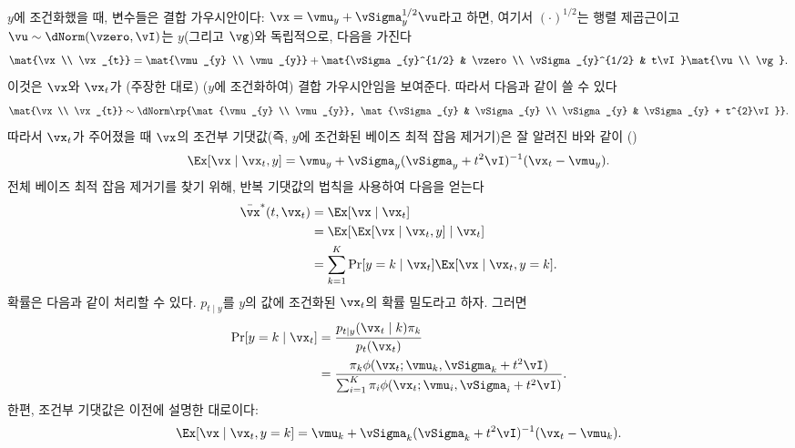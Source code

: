 \documentclass[../../book-main_ko.tex]{subfiles}
\begin{document}
\begin{example}
	\(y\)에 조건화했을 때, 변수들은 결합 가우시안이다: \(\vx = \vmu_{y} + \vSigma_{y}^{1/2}\vu\)라고 하면, 여기서 \((\cdot)^{1/2}\)는 행렬 제곱근이고 \(\vu \sim \dNorm(\vzero, \vI)\)는 \(y\)(그리고 \(\vg\))와 독립적으로, 다음을 가진다
	\begin{equation}
		\mat{\vx \\ \vx_{t}} = \mat{\vmu_{y} \\ \vmu_{y}} + \mat{\vSigma_{y}^{1/2} & \vzero \\ \vSigma_{y}^{1/2} & t\vI}\mat{\vu \\ \vg}.
	\end{equation}
	이것은 \(\vx\)와 \(\vx_{t}\)가 (주장한 대로) (\(y\)에 조건화하여) 결합 가우시안임을 보여준다. 따라서 다음과 같이 쓸 수 있다
	\begin{equation}
		\mat{\vx \\ \vx_{t}} \sim \dNorm\rp{\mat{\vmu_{y} \\ \vmu_{y}}, \mat{\vSigma_{y} & \vSigma_{y} \\ \vSigma_{y} & \vSigma_{y} + t^{2}\vI}}.
	\end{equation}
	따라서 \(\vx_{t}\)가 주어졌을 때 \(\vx\)의 조건부 기댓값(즉, \(y\)에 조건화된 베이즈 최적 잡음 제거기)은 잘 알려진 바와 같이 ()
	\begin{equation}
		\Ex[\vx \mid \vx_{t}, y] = \vmu_{y} + \vSigma_{y}(\vSigma_{y} + t^{2}\vI)^{-1}(\vx_{t} - \vmu_{y}).
	\end{equation}
	전체 베이즈 최적 잡음 제거기를 찾기 위해, 반복 기댓값의 법칙을 사용하여 다음을 얻는다
	\begin{align}
		\bar{\vx}^{\ast}(t, \vx_{t})
		&= \Ex[\vx \mid \vx_{t}] \\
		&= \Ex[\Ex[\vx \mid \vx_{t}, y] \mid \vx_{t}] \\
		&= \sum_{k = 1}^{K}\Pr[y = k \mid \vx_{t}]\Ex[\vx \mid \vx_{t}, y = k].
	\end{align}
	확률은 다음과 같이 처리할 수 있다. \(p_{t \mid y}\)를 \(y\)의 값에 조건화된 \(\vx_{t}\)의 확률 밀도라고 하자. 그러면
	\begin{align}
		\Pr[y = k \mid \vx_{t}]
		&= \frac{p_{t \mid y}(\vx_{t} \mid k)\pi_{k}}{p_{t}(\vx_{t})} \\
		&= \frac{\pi_{k}\phi(\vx_{t} ; \vmu_{k}, \vSigma_{k}
		+ t^{2}\vI)}{\sum_{i = 1}^{K}\pi_{i}\phi(\vx_{t} ; \vmu_{i}, \vSigma_{i} + t^{2}\vI)}.
	\end{align}
	한편, 조건부 기댓값은 이전에 설명한 대로이다:
	\begin{equation}
		\Ex[\vx \mid \vx_{t}, y = k] = \vmu_{k} + \vSigma_{k}(\vSigma_{k} + t^{2}\vI)^{-1}(\vx_{t} - \vmu_{k}).

\end{equation}
\end{example}
\end{document}
